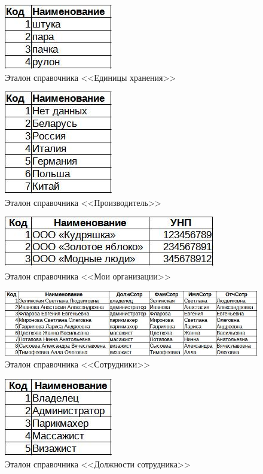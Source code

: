 \documentclass[12pt, a4paper, simple]{eskdtext}
\begin{document}
    \begin{figure}[!h]
        \centering
        \includegraphics[]
            {_docs/СП_ЕдХран_эталон.jpg}
        \caption{Эталон справочника <<Единицы хранения>>}
        \label{fig:CP_EdHran_etalon}
    \end{figure}
    
        \begin{figure}[!h]
            \centering
            \includegraphics[]
                {_docs/СП_Произв_эталон.jpg}
            \caption{Эталон справочника <<Производитель>>}
            \label{fig:CP_Proizv_etalon}
        \end{figure}

    \begin{figure}[!h]
        \centering
        \includegraphics[]
            {_docs/СП_МоиОрг_эталон.jpg}
        \caption{Эталон справочника <<Мои организации>>}
        \label{fig:CP_MoiOrg_etalon}
    \end{figure}

    \begin{figure}[!h]
        \centering
        \includegraphics[]
            {_docs/СП_Сотр_эталон.jpg}
        \caption{Эталон справочника <<Сотрудники>>}
        \label{fig:CP_Sotrudniki_etalon}
    \end{figure}

    \begin{figure}[!h]
        \centering
        \includegraphics[]
            {_docs/СП_ДолжнСотр_эталон.jpg}
        \caption{Эталон справочника <<Должности сотрудника>>}
        \label{fig:CP_DoljSotr_etalon}
    \end{figure}
\end{document}
